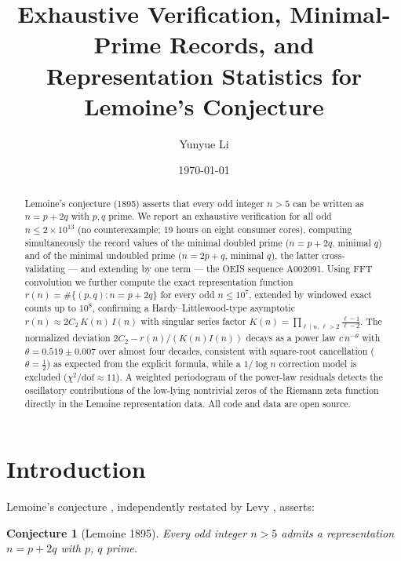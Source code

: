 \documentclass[11pt]{article}
\title{Exhaustive Verification, Minimal-Prime Records, and\\
Representation Statistics for Lemoine's Conjecture}
\author{Yunyue Li}
\date{\today}
\newtheorem{conjecture}{Conjecture}
\begin{document}
\maketitle

\begin{abstract}
Lemoine's conjecture (1895) asserts that every odd integer $n>5$ can be
written as $n=p+2q$ with $p,q$ prime. We report an exhaustive verification
for all odd $n \le 2\times10^{13}$ (no counterexample; 19 hours on eight
consumer cores),
computing simultaneously the record values of the minimal doubled prime
($n=p+2q$, minimal $q$) and of the minimal undoubled prime ($n=2p+q$,
minimal $q$), the latter cross-validating --- and extending by one
term --- the OEIS sequence A002091.
Using FFT convolution we further compute the exact representation function
$r(n)=\#\{(p,q):n=p+2q\}$ for every odd $n\le 10^{7}$, extended by
windowed exact counts up to $10^{8}$, confirming a
Hardy--Littlewood-type asymptotic $r(n)\approx 2C_2\,K(n)\,I(n)$ with
singular series factor $K(n)=\prod_{\ell\mid n,\,\ell>2}\frac{\ell-1}{\ell-2}$.
The normalized deviation $2C_2 - r(n)/(K(n)I(n))$ decays as a power law
$c\,n^{-\theta}$ with $\theta = 0.519 \pm 0.007$ over almost four decades,
consistent with square-root cancellation ($\theta=\tfrac12$) as expected
from the explicit formula, while a $1/\log n$ correction model is excluded
($\chi^2/\mathrm{dof} \approx 11$). A weighted periodogram of the
power-law residuals detects the oscillatory contributions of the
low-lying nontrivial zeros of the Riemann zeta function directly in the
Lemoine representation data. All code and data are open source.
\end{abstract}

\section{Introduction}

Lemoine's conjecture \cite{lemoine}, independently restated by Levy
\cite{levy}, asserts:

\begin{conjecture}[Lemoine 1895]
Every odd integer $n>5$ admits a representation $n = p + 2q$ with $p$, $q$ prime.
\end{conjecture}
\end{document}
